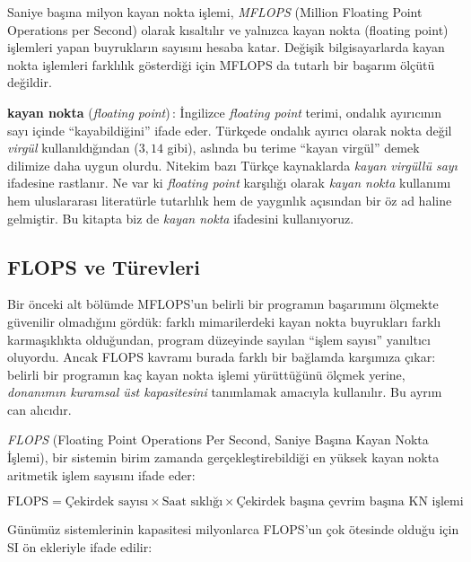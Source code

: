 Saniye başına milyon kayan nokta işlemi, \emph{MFLOPS} (Million Floating Point Operations per Second) olarak kısaltılır ve yalnızca kayan nokta (floating point) işlemleri yapan buyrukların sayısını hesaba katar. Değişik bilgisayarlarda kayan nokta işlemleri farklılık gösterdiği için MFLOPS da tutarlı bir başarım ölçütü değildir.

\begin{terimnotu}
\textbf{kayan nokta} (\emph{floating point})\,: İngilizce \emph{floating point} terimi, ondalık ayırıcının sayı içinde ``kayabildiğini'' ifade eder. Türkçede ondalık ayırıcı olarak nokta değil \emph{virgül} kullanıldığından ($3{,}14$ gibi), aslında bu terime ``kayan virgül'' demek dilimize daha uygun olurdu. Nitekim bazı Türkçe kaynaklarda \emph{kayan virgüllü sayı} ifadesine rastlanır. Ne var ki \emph{floating point} karşılığı olarak \emph{kayan nokta} kullanımı hem uluslararası literatürle tutarlılık hem de yaygınlık açısından bir öz ad haline gelmiştir. Bu kitapta biz de \emph{kayan nokta} ifadesini kullanıyoruz.
\end{terimnotu}

\subsection{FLOPS ve Türevleri}
\label{subsec:flops}

Bir önceki alt bölümde MFLOPS'un belirli bir programın başarımını ölçmekte güvenilir olmadığını gördük: farklı mimarilerdeki kayan nokta buyrukları farklı karmaşıklıkta olduğundan, program düzeyinde sayılan ``işlem sayısı'' yanıltıcı oluyordu. Ancak FLOPS kavramı burada farklı bir bağlamda karşımıza çıkar: belirli bir programın kaç kayan nokta işlemi yürüttüğünü ölçmek yerine, \emph{donanımın kuramsal üst kapasitesini} tanımlamak amacıyla kullanılır. Bu ayrım can alıcıdır.

\emph{FLOPS} (Floating Point Operations Per Second, Saniye Başına Kayan Nokta İşlemi), bir sistemin birim zamanda gerçekleştirebildiği en yüksek kayan nokta aritmetik işlem sayısını ifade eder:

\begin{equation}
\text{FLOPS} = \text{Çekirdek sayısı} \times \text{Saat sıklığı} \times \text{Çekirdek başına çevrim başına KN işlemi}
\label{eq:flops}
\end{equation}

Günümüz sistemlerinin kapasitesi milyonlarca FLOPS'un çok ötesinde olduğu için SI ön ekleriyle ifade edilir:

